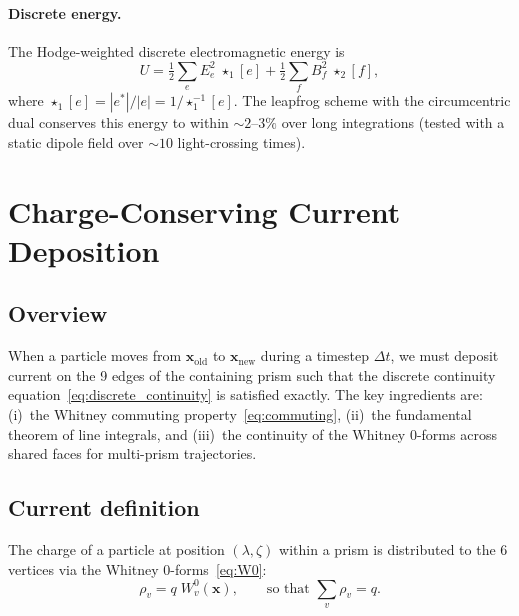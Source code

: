 \documentclass[11pt,a4paper]{article}
\newcommand{\half}{\tfrac{1}{2}}
\newcommand{\hodge}{\star}
\begin{document}
\paragraph{Discrete energy.}
The Hodge-weighted discrete electromagnetic energy is
\begin{equation}
  U = \half\sum_e E_e^2\;\hodge_1[e]
    + \half\sum_f B_f^2\;\hodge_2[f],
  \label{eq:discrete_energy}
\end{equation}
where $\hodge_1[e] = |e^*|/|e| = 1/\hodge_1^{-1}[e]$.
The leapfrog scheme with the circumcentric dual conserves this energy to
within $\sim 2$--$3\%$ over long integrations (tested with a static dipole
field over $\sim 10$ light-crossing times).

\section{Charge-Conserving Current Deposition}
\label{sec:deposition}

\subsection{Overview}

When a particle moves from $\bm{x}_\text{old}$ to $\bm{x}_\text{new}$ during
a timestep $\Delta t$, we must deposit current on the 9 edges of the
containing prism such that the discrete continuity
equation~\eqref{eq:discrete_continuity} is satisfied exactly. The key
ingredients are: (i)~the Whitney commuting property~\eqref{eq:commuting},
(ii)~the fundamental theorem of line integrals, and (iii)~the continuity of the
Whitney 0-forms across shared faces for multi-prism trajectories.

\subsection{Current definition}
\label{sec:current_def}

The charge of a particle at position $(\lambda, \zeta)$ within a prism is
distributed to the 6 vertices via the Whitney 0-forms~\eqref{eq:W0}:
\begin{equation}
  \rho_v = q\;W^0_v(\bm{x}), \qquad
  \text{so that } \sum_v \rho_v = q.
  \label{eq:charge_deposit}
\end{equation}
\end{document}
